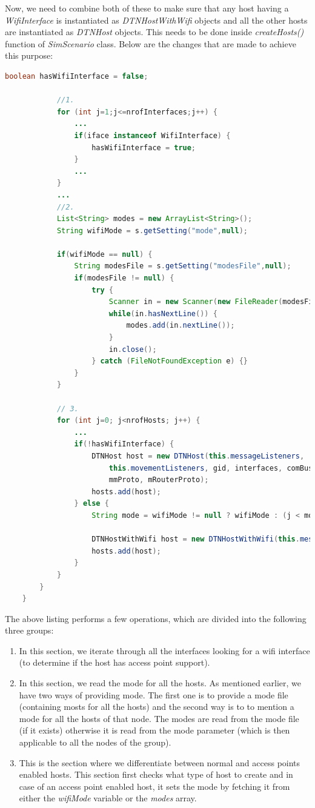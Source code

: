 Now, we need to combine both of these to make sure that any host having a \textit{WifiInterface} is instantiated as \textit{DTNHostWithWifi} objects and all the other hosts are instantiated as \textit{DTNHost} objects. This needs to be done inside \textit{createHosts()} function of \textit{SimScenario} class. Below are the changes that are made to achieve this purpose:
\vspace{3mm}
\begin{lstlisting}[language=java]
			boolean hasWifiInterface = false;

			//1.
			for (int j=1;j<=nrofInterfaces;j++) {
				...
				if(iface instanceof WifiInterface) {
					hasWifiInterface = true;
				}
				...
			}
			...
			//2.
			List<String> modes = new ArrayList<String>();
			String wifiMode = s.getSetting("mode",null);

			if(wifiMode == null) {
				String modesFile = s.getSetting("modesFile",null);
				if(modesFile != null) {
					try {
						Scanner in = new Scanner(new FileReader(modesFile));
						while(in.hasNextLine()) {
							modes.add(in.nextLine());
						}
						in.close();
					} catch (FileNotFoundException e) {}
				}
			}

			// 3.
			for (int j=0; j<nrofHosts; j++) {
				...
				if(!hasWifiInterface) {
					DTNHost host = new DTNHost(this.messageListeners,
						this.movementListeners,	gid, interfaces, comBus,
						mmProto, mRouterProto);
					hosts.add(host);
				} else {
					String mode = wifiMode != null ? wifiMode : (j < modes.size() ? modes.get(j) : "");

					DTNHostWithWifi host = new DTNHostWithWifi(this.messageListeners, this.movementListeners, gid, interfaces, comBus, mmProto, mRouterProto,  mode: mode);
					hosts.add(host);
				}
			}
		}
	}
\end{lstlisting}
\vspace{3mm}
The above listing performs a few operations, which are divided into the following three groups:
\begin{enumerate}
	\item In this section, we iterate through all the interfaces looking for a wifi interface (to determine if the host has access point support).
	\item In this section, we read the mode for all the hosts. As mentioned earlier, we have two ways of providing mode. The first one is to provide a mode file (containing mosts for all the hosts) and the second way is to to mention a mode for all the hosts of that node. The modes are read from the mode file (if it exists) otherwise it is read from the mode parameter (which is then applicable to all the nodes of the group).
	\item This is the section where we differentiate between normal and access points enabled hosts. This section first checks what type of host to create and in case of an access point enabled host, it sets the mode by fetching it from either the \textit{wifiMode} variable or the \textit{modes} array.
\end{enumerate}
